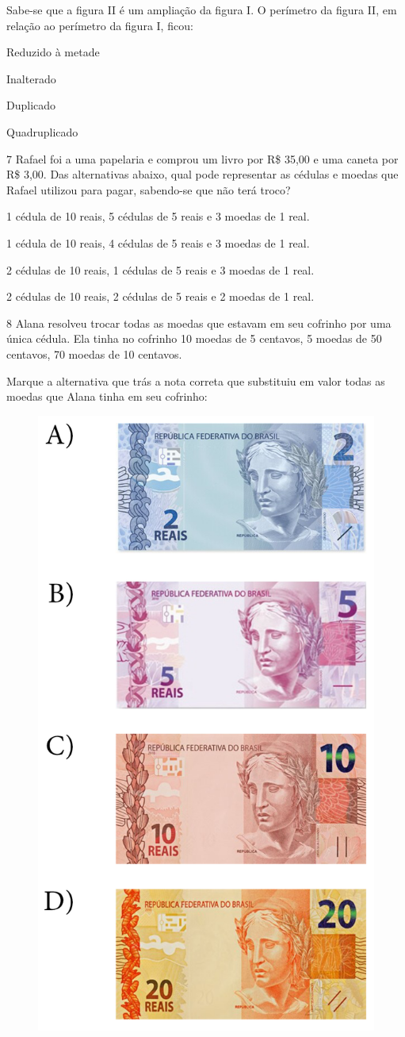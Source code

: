 Sabe-se que a figura II é um ampliação da figura I. O perímetro da
figura II, em relação ao perímetro da figura I, ficou:

\begin{minipage}{.5\textwidth}
\begin{escolha}
\item
  Reduzido à metade
\item
  Inalterado
\item
  Duplicado
\item
  Quadruplicado
\end{escolha}
\end{minipage}

\num{7} Rafael foi a uma papelaria e comprou um livro por R\$ 35,00 e uma
caneta por R\$ 3,00. Das alternativas abaixo, qual pode representar as
cédulas e moedas que Rafael utilizou para pagar, sabendo-se que não terá
troco?

\begin{escolha}
\item
  1 cédula de 10 reais, 5 cédulas de 5 reais e 3 moedas de 1 real.
\item
  1 cédula de 10 reais, 4 cédulas de 5 reais e 3 moedas de 1 real.
\item
  2 cédulas de 10 reais, 1 cédulas de 5 reais e 3 moedas de 1 real.
\item
  2 cédulas de 10 reais, 2 cédulas de 5 reais e 2 moedas de 1 real.
\end{escolha}


\pagebreak
\num{8} Alana resolveu trocar todas as moedas que estavam em seu cofrinho
por uma única cédula. Ela tinha no cofrinho 10 moedas de 5 centavos, 5
moedas de 50 centavos, 70 moedas de 10 centavos.

Marque a alternativa que trás a nota correta que substituiu em valor
todas as moedas que Alana tinha em seu cofrinho:

\begin{figure}[htpb!]
\includegraphics[width=.3\textwidth]{../ilustracoes/MAT5/SAEB_5ANO_MAT_figura126.png}
\end{figure}

